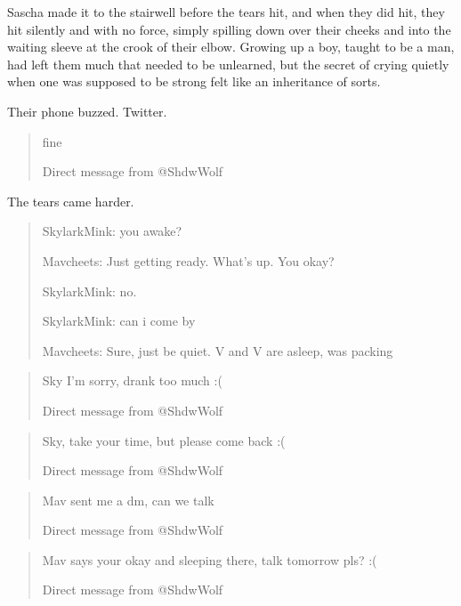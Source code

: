 \secdiv{}

Sascha made it to the stairwell before the tears hit, and when they did hit, they hit silently and with no force, simply spilling down over their cheeks and into the waiting sleeve at the crook of their elbow. Growing up a boy, taught to be a man, had left them much that needed to be unlearned, but the secret of crying quietly when one was supposed to be strong felt like an inheritance of sorts.

Their phone buzzed. Twitter.

\begin{quote}
fine

Direct message from @ShdwWolf
\end{quote}

The tears came harder.

\secdiv{}

\begin{quote}
SkylarkMink: you awake?

Mavcheets: Just getting ready. What's up. You okay?

SkylarkMink: no.

SkylarkMink: can i come by

Mavcheets: Sure, just be quiet. V and V are asleep, was packing
\end{quote}

\secdiv{}

\begin{quote}
Sky I'm sorry, drank too much :(

Direct message from @ShdwWolf
\end{quote}

\secdiv{}

\begin{quote}
Sky, take your time, but please come back :(

Direct message from @ShdwWolf
\end{quote}

\secdiv{}

\begin{quote}
Mav sent me a dm, can we talk

Direct message from @ShdwWolf
\end{quote}

\secdiv{}

\begin{quote}
Mav says your okay and sleeping there, talk tomorrow pls? :(

Direct message from @ShdwWolf
\end{quote}

